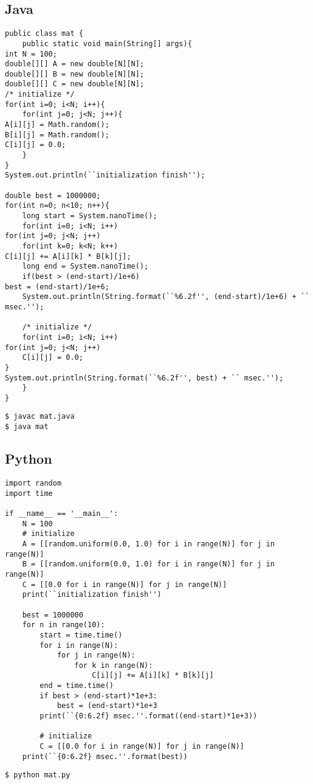 \documentclass[onecolumn]{preport}
\begin{document}
\subsection{Java}
\begin{lstlisting}[basicstyle=\ttfamily\footnotesize, frame=single, caption=mat.java]
public class mat {
    public static void main(String[] args){
int N = 100;
double[][] A = new double[N][N];
double[][] B = new double[N][N];
double[][] C = new double[N][N];
/* initialize */
for(int i=0; i<N; i++){
    for(int j=0; j<N; j++){
A[i][j] = Math.random();
B[i][j] = Math.random();
C[i][j] = 0.0;
    }
}
System.out.println(``initialization finish'');

double best = 1000000;
for(int n=0; n<10; n++){
    long start = System.nanoTime();
    for(int i=0; i<N; i++)
for(int j=0; j<N; j++)
    for(int k=0; k<N; k++)
C[i][j] += A[i][k] * B[k][j];
    long end = System.nanoTime();
    if(best > (end-start)/1e+6)
best = (end-start)/1e+6;
    System.out.println(String.format(``%6.2f'', (end-start)/1e+6) + `` msec.'');

    /* initialize */
    for(int i=0; i<N; i++)
for(int j=0; j<N; j++)
    C[i][j] = 0.0;
}
System.out.println(String.format(``%6.2f'', best) + `` msec.'');
    }
}
\end{lstlisting}
\begin{lstlisting}[basicstyle=\ttfamily\footnotesize, frame=single]
$ javac mat.java
$ java mat
\end{lstlisting}

\subsection{Python}
\begin{lstlisting}[basicstyle=\ttfamily\footnotesize, frame=single, caption=mat.py]
import random
import time

if __name__ == '__main__':
    N = 100
    # initialize
    A = [[random.uniform(0.0, 1.0) for i in range(N)] for j in range(N)]
    B = [[random.uniform(0.0, 1.0) for i in range(N)] for j in range(N)]
    C = [[0.0 for i in range(N)] for j in range(N)]
    print(``initialization finish'')

    best = 1000000
    for n in range(10):
        start = time.time()
        for i in range(N):
            for j in range(N):
                for k in range(N):
                    C[i][j] += A[i][k] * B[k][j]
        end = time.time()
        if best > (end-start)*1e+3:
            best = (end-start)*1e+3
        print(``{0:6.2f} msec.''.format((end-start)*1e+3))

        # initialize
        C = [[0.0 for i in range(N)] for j in range(N)]
    print(``{0:6.2f} msec.''.format(best))
\end{lstlisting}
\begin{lstlisting}[basicstyle=\ttfamily\footnotesize, frame=single]
$ python mat.py
\end{lstlisting}
\end{document}
